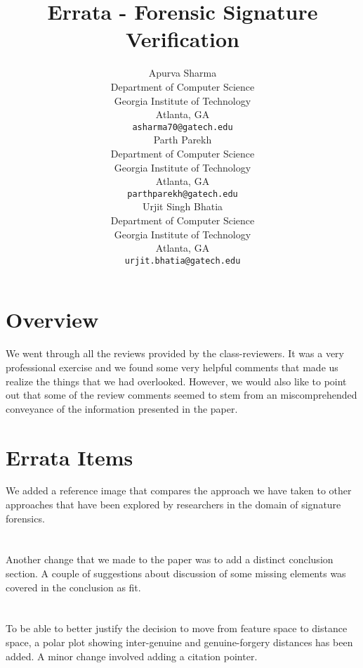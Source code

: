 \documentclass{article}
\title{Errata - Forensic Signature Verification}
\author{
Apurva Sharma\\
Department of Computer Science\\
Georgia Institute of Technology\\
Atlanta, GA\\
\texttt{asharma70@gatech.edu} \\
\And
Parth Parekh\\
Department of Computer Science\\
Georgia Institute of Technology\\
Atlanta, GA\\
\texttt{parthparekh@gatech.edu} \\
\And
Urjit Singh Bhatia\\
Department of Computer Science\\
Georgia Institute of Technology\\
Atlanta, GA\\
\texttt{urjit.bhatia@gatech.edu} \\
}
\begin{document}
\maketitle

\section{Overview}
We went through all the reviews provided by the class-reviewers. It was a very professional exercise and we found some very helpful comments that made us realize the things that we had overlooked. However, we would also like to point out that some of the review comments seemed to stem from an miscomprehended conveyance of the information presented in the paper.

\section{Errata Items}

We added a reference image that compares the approach we have taken to other approaches that have been explored by researchers in the domain of signature forensics.
\\
\\
\\
Another change that we made to the paper was to add a distinct conclusion section. A couple of suggestions about discussion of some missing elements was covered in the conclusion as fit.
\\
\\
\\
To be able to better justify the decision to move from feature space to distance space, a polar plot showing inter-genuine and genuine-forgery distances has been added. A minor change involved adding a citation pointer.
\end{document}
